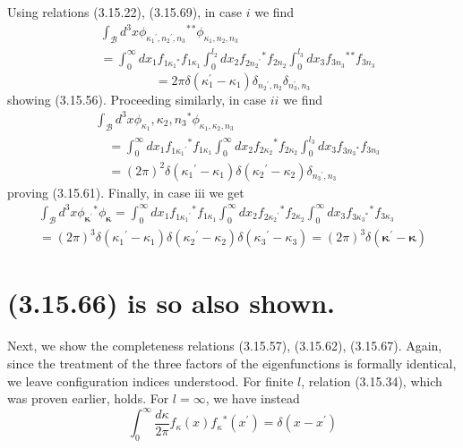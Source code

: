 \documentclass{article}
\begin{document}
Using relations (3.15.22), (3.15.69), in case $i$ we find
$$
\begin{align*}
& \int_{\mathcal{B}} d^{3} x \phi_{\kappa_{1}{ }^{\prime}, n_{2}{ }^{\prime}, n_{3}}{ }^{*}{ }^{*} \phi_{\kappa_{1}, n_{2}, n_{3}}  \tag{3.15.72}\\
& =\int_{0}^{\infty} d x_{1} f_{1 \kappa_{1}{ }{ }^{*}} f_{1 \kappa_{1}} \int_{0}^{l_{2}} d x_{2} f_{2 n_{2}{ }^{\prime}}{ }^{*} f_{2 n_{2}} \int_{0}^{l_{3}} d x_{3} f_{3 n_{3}}{ }^{*}{ }^{*} f_{3 n_{3}}
\end{align*}
$$
$$
=2 \pi \delta\left(\kappa_{1}^{\prime}-\kappa_{1}\right) \delta_{n_{2}{ }^{\prime}, n_{2}} \delta_{n_{3}^{\prime}, n_{3}}
$$
showing (3.15.56). Proceeding similarly, in case $i i$ we find
$$
\begin{align*}
& \int_{\mathcal{B}} d^{3} x \phi_{\kappa_{1}}, \kappa_{2}, n_{3}{ }^{*} \phi_{\kappa_{1}, \kappa_{2}, n_{3}}  \tag{3.15.73}\\
& \quad=\int_{0}^{\infty} d x_{1} f_{1 \kappa_{1}{ }^{\prime}}{ }^{*} f_{1 \kappa_{1}} \int_{0}^{\infty} d x_{2} f_{2 \kappa_{2}}{ }^{*} f_{2 \kappa_{2}} \int_{0}^{l_{3}} d x_{3} f_{3 n_{3}{ }{ }^{*}} f_{3 n_{3}} \\
& \quad=(2 \pi)^{2} \delta\left(\kappa_{1}{ }^{\prime}-\kappa_{1}\right) \delta\left(\kappa_{2}{ }^{\prime}-\kappa_{2}\right) \delta_{n_{3}{ }^{\prime}, n_{3}}
\end{align*}
$$
proving (3.15.61). Finally, in case iii we get
$$
\begin{align*}
\int_{\mathcal{B}} d^{3} x \phi_{\boldsymbol{\kappa}^{\prime}}{ }^{*} \phi_{\boldsymbol{\kappa}}=\int_{0}^{\infty} d x_{1} f_{1 \kappa_{1}{ }^{\prime}}{ }^{*} f_{1 \kappa_{1}} \int_{0}^{\infty} d x_{2} f_{2 \kappa_{2}{ }^{\prime}}{ }^{*} f_{2 \kappa_{2}} \int_{0}^{\infty} d x_{3} f_{3 \kappa_{3}{ }^{*}}{ }^{*} f_{3 \kappa_{3}}  \tag{3.15.74}\\
=(2 \pi)^{3} \delta\left(\kappa_{1}{ }^{\prime}-\kappa_{1}\right) \delta\left(\kappa_{2}{ }^{\prime}-\kappa_{2}\right) \delta\left(\kappa_{3}{ }^{\prime}-\kappa_{3}\right)=(2 \pi)^{3} \delta\left(\boldsymbol{\kappa}^{\prime}-\boldsymbol{\kappa}\right)
\end{align*}
$$

\section*{(3.15.66) is so also shown.}

Next, we show the completeness relations (3.15.57), (3.15.62), (3.15.67). Again, since the treatment of the three factors of the eigenfunctions is formally identical, we leave configuration indices understood. For finite $l$, relation (3.15.34), which was proven earlier, holds. For $l=\infty$, we have instead
$$
\begin{equation*}
\int_{0}^{\infty} \frac{d \kappa}{2 \pi} f_{\kappa}(x) f_{\kappa}{ }^{*}\left(x^{\prime}\right)=\delta\left(x-x^{\prime}\right) \tag{3.15.75}
\end{equation*}
$$
\end{document}
